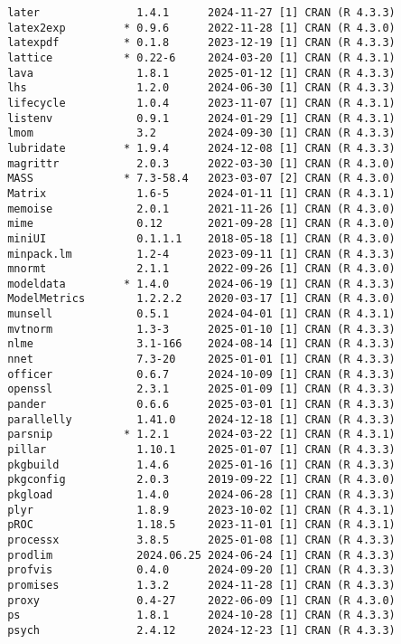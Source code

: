 \documentclass[
]{article}
\begin{document}
\begin{verbatim}
 later               1.4.1      2024-11-27 [1] CRAN (R 4.3.3)
 latex2exp         * 0.9.6      2022-11-28 [1] CRAN (R 4.3.0)
 latexpdf          * 0.1.8      2023-12-19 [1] CRAN (R 4.3.3)
 lattice           * 0.22-6     2024-03-20 [1] CRAN (R 4.3.1)
 lava                1.8.1      2025-01-12 [1] CRAN (R 4.3.3)
 lhs                 1.2.0      2024-06-30 [1] CRAN (R 4.3.3)
 lifecycle           1.0.4      2023-11-07 [1] CRAN (R 4.3.1)
 listenv             0.9.1      2024-01-29 [1] CRAN (R 4.3.1)
 lmom                3.2        2024-09-30 [1] CRAN (R 4.3.3)
 lubridate         * 1.9.4      2024-12-08 [1] CRAN (R 4.3.3)
 magrittr            2.0.3      2022-03-30 [1] CRAN (R 4.3.0)
 MASS              * 7.3-58.4   2023-03-07 [2] CRAN (R 4.3.0)
 Matrix              1.6-5      2024-01-11 [1] CRAN (R 4.3.1)
 memoise             2.0.1      2021-11-26 [1] CRAN (R 4.3.0)
 mime                0.12       2021-09-28 [1] CRAN (R 4.3.0)
 miniUI              0.1.1.1    2018-05-18 [1] CRAN (R 4.3.0)
 minpack.lm          1.2-4      2023-09-11 [1] CRAN (R 4.3.3)
 mnormt              2.1.1      2022-09-26 [1] CRAN (R 4.3.0)
 modeldata         * 1.4.0      2024-06-19 [1] CRAN (R 4.3.3)
 ModelMetrics        1.2.2.2    2020-03-17 [1] CRAN (R 4.3.0)
 munsell             0.5.1      2024-04-01 [1] CRAN (R 4.3.1)
 mvtnorm             1.3-3      2025-01-10 [1] CRAN (R 4.3.3)
 nlme                3.1-166    2024-08-14 [1] CRAN (R 4.3.3)
 nnet                7.3-20     2025-01-01 [1] CRAN (R 4.3.3)
 officer             0.6.7      2024-10-09 [1] CRAN (R 4.3.3)
 openssl             2.3.1      2025-01-09 [1] CRAN (R 4.3.3)
 pander              0.6.6      2025-03-01 [1] CRAN (R 4.3.3)
 parallelly          1.41.0     2024-12-18 [1] CRAN (R 4.3.3)
 parsnip           * 1.2.1      2024-03-22 [1] CRAN (R 4.3.1)
 pillar              1.10.1     2025-01-07 [1] CRAN (R 4.3.3)
 pkgbuild            1.4.6      2025-01-16 [1] CRAN (R 4.3.3)
 pkgconfig           2.0.3      2019-09-22 [1] CRAN (R 4.3.0)
 pkgload             1.4.0      2024-06-28 [1] CRAN (R 4.3.3)
 plyr                1.8.9      2023-10-02 [1] CRAN (R 4.3.1)
 pROC                1.18.5     2023-11-01 [1] CRAN (R 4.3.1)
 processx            3.8.5      2025-01-08 [1] CRAN (R 4.3.3)
 prodlim             2024.06.25 2024-06-24 [1] CRAN (R 4.3.3)
 profvis             0.4.0      2024-09-20 [1] CRAN (R 4.3.3)
 promises            1.3.2      2024-11-28 [1] CRAN (R 4.3.3)
 proxy               0.4-27     2022-06-09 [1] CRAN (R 4.3.0)
 ps                  1.8.1      2024-10-28 [1] CRAN (R 4.3.3)
 psych               2.4.12     2024-12-23 [1] CRAN (R 4.3.3)

\end{verbatim}
\end{document}
